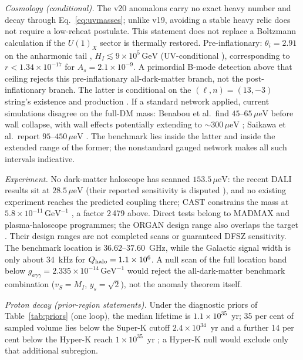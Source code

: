\documentclass[11pt,a4paper]{article}
\newcommand{\ueV}{\,\mu\mathrm{eV}}
\newcommand{\GeV}{\,\mathrm{GeV}}
\begin{document}
\emph{Cosmology (conditional).} The v20 anomalons carry no exact heavy
number and decay through Eq.~\eqref{eq:uvmasses}; unlike v19, avoiding a
stable heavy relic does not require a low-reheat postulate. This statement
does not replace a Boltzmann calculation if the $U(1)_X$ sector is
thermally restored. Pre-inflationary: $\theta_i = 2.91$ on
the anharmonic tail \cite{KKT}, $H_I \lesssim 9\times10^{5}\GeV$
(UV-conditional \cite{GR25}), corresponding to
$r<1.34\times10^{-17}$ for $A_s=2.1\times10^{-9}$. A primordial
B-mode detection above that ceiling rejects this pre-inflationary
all-dark-matter branch, not the post-inflationary branch. The latter is
conditional on the
$(\ell,n)=(13,-3)$ string's existence and production \cite{LRS}. If a
standard network applied, current simulations disagree on the full-DM
mass: Benabou et al.\ find $45$--$65\ueV$ before wall collapse, with
wall effects potentially extending to $\sim300\ueV$ \cite{Benabou};
Saikawa et al.\ report $95$--$450\ueV$ \cite{Saikawa}. The benchmark
lies inside the latter and inside the extended range of the former;
the nonstandard gauged network makes all such intervals indicative.

\emph{Experiment.} No dark-matter haloscope has scanned $153.5\ueV$: the
recent DALI results sit at $28.5\ueV$ \cite{DALI} (their reported
sensitivity is disputed \cite{DALIcomment}), and no existing experiment
reaches the predicted coupling there; CAST constrains the mass at
$5.8\times10^{-11}\GeV^{-1}$ \cite{CAST}, a factor 2\,479 above.
Direct tests belong to MADMAX \cite{MADMAX} and plasma-haloscope
\cite{ALPHA} programmes; the ORGAN design range also overlaps the target
\cite{ORGAN}. Their design ranges are not completed scans or guaranteed
DFSZ sensitivity. The benchmark location is $36.62$--$37.60$~GHz, while
the Galactic signal width is only about $34$~kHz for
$Q_{\rm halo}=1.1\times10^6$. A null scan of the full location band below
$g_{a\gamma\gamma}=2.335\times10^{-14}\GeV^{-1}$ would reject the
all-dark-matter benchmark combination ($v_S{=}M_I$, $y_s{=}\sqrt2$), not
the anomaly theorem itself.

\emph{Proton decay (prior-region statements).} Under the diagnostic
priors of Table~\ref{tab:priors} (one loop), the median lifetime is
$1.1\times10^{35}$~yr; 35 per cent of sampled volume lies below the
Super-K cutoff $2.4\times10^{34}$~yr \cite{SK} and a further 14 per
cent below the Hyper-K reach $1\times10^{35}$~yr \cite{HKsnowmass};
a Hyper-K null would exclude only that additional subregion.
\end{document}

